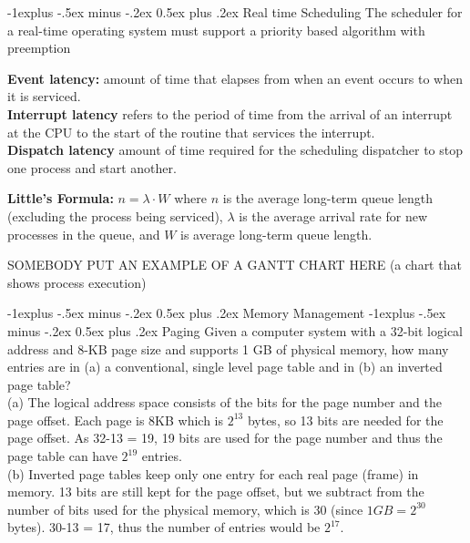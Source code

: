 \documentclass[letterpaper, 12pt]{extarticle}
\makeatletter
\renewcommand{\section}{\@startsection{section}{1}{0mm}%
                                {-1explus -.5ex minus -.2ex}%
                                {0.5ex plus .2ex}%
                                {\normalfont\normalsize\bfseries}}
\renewcommand{\subsection}{\@startsection{subsection}{2}{0mm}%
                                {-1explus -.5ex minus -.2ex}%
                                {0.5ex plus .2ex}%
                                {\normalfont\small\bfseries}}
\makeatother
\begin{document}
\begin{multicols*}{6}
    \subsection{Real time Scheduling}
    The scheduler for a real-time operating system must support a priority based 
    algorithm with preemption

    \textbf{Event latency:} amount of time that elapses from when an event occurs 
    to when it is serviced.\\
    \textbf{Interrupt latency} refers to the period of time from the arrival of 
    an interrupt at the CPU to the start of the routine that services the 
    interrupt.\\
    \textbf{Dispatch latency} amount of time required for the scheduling 
    dispatcher to stop one process and start another.

    \textbf{Little's Formula:} $n = \lambda \cdot W$ where $n$ is the 
    average long-term queue length (excluding the process being serviced), 
    $\lambda$ is the average arrival rate for new processes in the queue,
    and $W$ is average long-term queue length.


    SOMEBODY PUT AN EXAMPLE OF A GANTT CHART HERE (a chart that shows process
    execution)

    \section{Memory Management}
    \subsection{Paging}
    Given a computer system with a 32-bit logical address and 8-KB page
    size and supports 1 GB of physical memory, how many entries are in
    (a) a conventional, single level page table and in (b) an inverted
    page table? \\
    (a) The logical address space consists of the bits for the page number
    and the page offset. Each page is 8KB which is $2^{13}$ bytes, so 13 bits
    are needed for the page offset. As 32-13 = 19, 19 bits are used for
    the page number and thus the page table can have $2^{19}$ entries. \\
    (b) Inverted page tables keep only one entry for each real page
    (frame) in memory. 13 bits are still kept for the page offset, but
    we subtract from  the number of bits used for the physical memory,
    which is 30 (since $1GB = 2^30$ bytes). 30-13 = 17, thus the
    number of entries would be $2^{17}$.

\end{multicols*}
\end{document}
